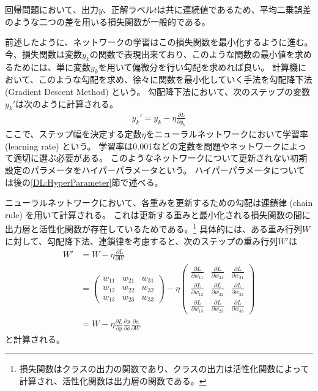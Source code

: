 回帰問題において、出力$y$、正解ラベル$t$は共に連続値であるため、平均二乗誤差のような二つの差を用いる損失関数が一般的である。

前述したように、ネットワークの学習はこの損失関数を最小化するように進む。
今、損失関数は変数$y_k$の関数で表現出来ており、このような関数の最小値を求めるためには、単に変数$y_k$を用いて偏微分を行い勾配を求めれば良い。
計算機において、このような勾配を求め、徐々に関数を最小化していく手法を勾配降下法 (Gradient Descent Method) という。
勾配降下法において、次のステップの変数$y_k'$は次のように計算される。
\begin{equation}
 \begin{split}
  y_k' = y_k - \eta \frac{\partial L}{\partial y_k}
 \end{split}
\end{equation}
ここで、ステップ幅を決定する定数$\eta$をニューラルネットワークにおいて学習率 (learning rate) という。
学習率は0.001などの定数を問題やネットワークによって適切に選ぶ必要がある。
このようなネットワークについて更新されない初期設定のパラメータをハイパーパラメータという。
ハイパーパラメータについては後の\ref{DL:HyperParameter}節で述べる。

ニューラルネットワークにおいて、各重みを更新するための勾配は連鎖律 (chain rule) を用いて計算される。
これは更新する重みと最小化される損失関数の間に出力層と活性化関数が存在しているためである。\footnote{損失関数はクラスの出力の関数であり、クラスの出力は活性化関数によって計算され、活性化関数は出力層の関数である。}
具体的には、ある重み行列$W$に対して、勾配降下法、連鎖律を考慮すると、次のステップの重み行列$W'$は
\begin{equation}
 \begin{split}
  W' &= W - \eta \frac{\partial L}{\partial W}\\
    &=
  \left(
    \begin{array}{ccc}
      w_{11} & w_{21} & w_{31} \\
      w_{12} & w_{22} & w_{32} \\
      w_{13} & w_{23} & w_{33}
    \end{array}
  \right)
  - \eta
  \left(
    \begin{array}{ccc}
      \frac{\partial L}{\partial w_{11}} & \frac{\partial L}{\partial w_{21}} & \frac{\partial L}{\partial w_{31}} \\
      \frac{\partial L}{\partial w_{12}} & \frac{\partial L}{\partial w_{22}} & \frac{\partial L}{\partial w_{32}} \\
      \frac{\partial L}{\partial w_{13}} & \frac{\partial L}{\partial w_{23}} & \frac{\partial L}{\partial w_{33}}
    \end{array}
  \right)\\
    &= W - \eta \frac{\partial L}{\partial y}\frac{\partial y}{\partial a}\frac{\partial a}{\partial W}
 \end{split}
\end{equation}
と計算される。

